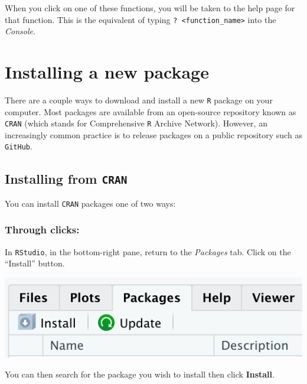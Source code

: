\documentclass[]{book}
\begin{document}
When you click on one of these functions, you will be taken to the help page for that function. This is the equivalent of typing \texttt{?\ \textless{}function\_name\textgreater{}} into the \emph{Console}.

\hypertarget{installing-a-new-package}{%
\section*{Installing a new package}\label{installing-a-new-package}}

There are a couple ways to download and install a new \texttt{R} package on your computer. Most packages are available from an open-source repository known as \texttt{CRAN} (which stands for Comprehensive \texttt{R} Archive Network). However, an increasingly common practice is to release packages on a public repository such as \texttt{GitHub}.

\hypertarget{installing-from-cran}{%
\subsection*{\texorpdfstring{Installing from \texttt{CRAN}}{Installing from CRAN}}\label{installing-from-cran}}

You can install \texttt{CRAN} packages one of two ways:

\hypertarget{through-clicks}{%
\subsubsection*{Through clicks:}\label{through-clicks}}

In \texttt{RStudio}, in the bottom-right pane, return to the \emph{Packages} tab. Click on the ``Install'' button.

\includegraphics{img/rstudio_install-package.png}

You can then search for the package you wish to install then click \textbf{Install}.
\end{document}
